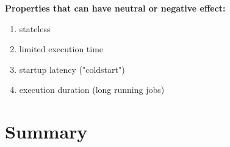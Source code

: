\textbf{Properties that can have neutral or negative effect:}
\begin{enumerate}
    \item stateless 
    \item limited execution time
    \item startup latency ("coldstart")
    \item execution duration (long running jobs)
\end{enumerate}

\section{Summary}
